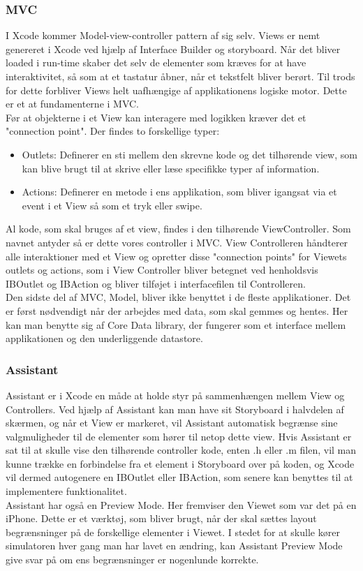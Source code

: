 \documentclass[a4paper,10pt,titlepage]{article}
\begin{document}
\subsubsection{MVC}
I Xcode kommer Model-view-controller pattern af sig selv. Views er nemt genereret i Xcode ved hjælp af Interface Builder og storyboard. Når det bliver loaded i run-time skaber det selv de elementer som kræves for at have interaktivitet, så som at et tastatur åbner, når et tekstfelt bliver berørt. Til trods for dette forbliver Views helt uafhængige af applikationens logiske motor. Dette er et at fundamenterne i MVC. \\
Før at objekterne i et View kan interagere med logikken kræver det et "connection point". Der findes to forskellige typer:
\begin{itemize}
\item
Outlets: Definerer en sti mellem den skrevne kode og det tilhørende view, som kan blive brugt til at skrive eller læse specifikke typer af information.
\item
Actions: Definerer en metode i ens applikation, som bliver igangsat via et event i et View så som et tryk eller swipe.
\end{itemize}  
Al kode, som skal bruges af et view, findes i den tilhørende ViewController. Som navnet antyder så er dette vores controller i MVC. View Controlleren håndterer alle interaktioner med et View og opretter disse "connection points" for Viewets outlets og actions, som i View Controller bliver betegnet ved henholdsvis IBOutlet og IBAction og bliver tilføjet i interfacefilen til Controlleren. \\
Den sidste del af MVC, Model, bliver ikke benyttet i de fleste applikationer. Det er først nødvendigt når der arbejdes med data, som skal gemmes og hentes. Her kan man benytte sig af Core Data library, der fungerer som et interface mellem applikationen og den underliggende datastore.\parencite{Teach}
\subsubsection{Assistant}
Assistant er i Xcode en måde at holde styr på sammenhængen mellem View og Controllers. Ved hjælp af Assistant kan man have sit Storyboard i halvdelen af skærmen, og når et View er markeret, vil Assistant automatisk begrænse sine valgmuligheder til de elementer som hører til netop dette view. Hvis Assistant er sat til at skulle vise den tilhørende controller kode, enten .h eller .m filen, vil man kunne trække en forbindelse fra et element i Storyboard over på koden, og Xcode vil dermed autogenere en IBOutlet eller IBAction, som senere kan benyttes til at implementere funktionalitet.\\
Assistant har også en Preview Mode. Her fremviser den Viewet som var det på en iPhone. Dette er et værktøj, som bliver brugt, når der skal sættes layout begrænsninger på de forskellige elementer i Viewet. I stedet for at skulle kører simulatoren hver gang man har lavet en ændring, kan Assistant Preview Mode give svar på om ens begrænsninger er nogenlunde korrekte.
\end{document}
